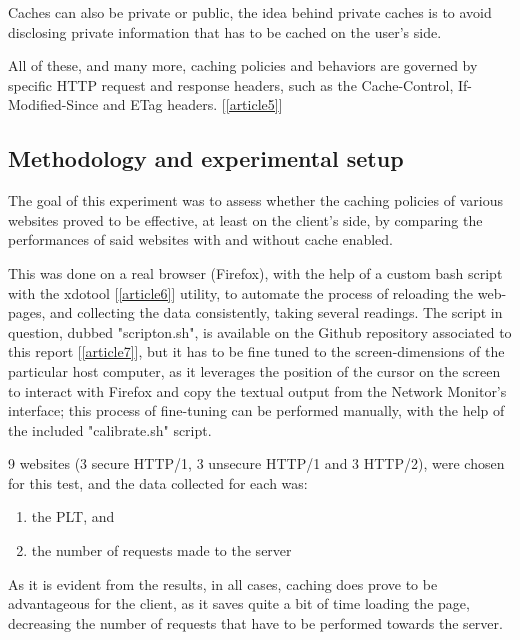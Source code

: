 \documentclass[a4paper,10pt]{article}
\begin{document}
Caches can also be private or public, the idea behind private caches is to avoid disclosing private information that has to be cached on the user's side.

All of these, and many more, caching policies and behaviors are governed by specific HTTP request and response headers, such as the Cache-Control, If-Modified-Since and ETag headers. [\ref{article5}] 

\subsection{Methodology and experimental setup}

The goal of this experiment was to assess whether the caching policies of various websites proved to be effective, at least on the client's side, by comparing the performances of said websites with and without cache enabled. 

This was done on a real browser (Firefox), with the help of a custom bash script with the xdotool [\ref{article6}] utility, to automate the process of reloading the web-pages, and collecting the data consistently, taking several readings. The script in question, dubbed "scripton.sh", is available on the Github repository associated to this report [\ref{article7}], but it has to be fine tuned to the screen-dimensions of the particular host computer, as it leverages the position of the cursor on the screen to interact with Firefox and copy the textual output from the Network Monitor's interface; this process of fine-tuning can be performed manually, with the help of the included "calibrate.sh" script. 


9 websites (3 secure HTTP/1, 3 unsecure HTTP/1 and 3 HTTP/2), were chosen for this test, and the data collected for each was: 


\begin{enumerate}

\item the PLT, and
\item the number of requests made to the server

\end{enumerate}

As it is evident from the results, in all cases, caching does prove to be advantageous for the client, as it saves quite a bit of time loading the page, decreasing the number of requests that have to be performed towards the server.
\end{document}
